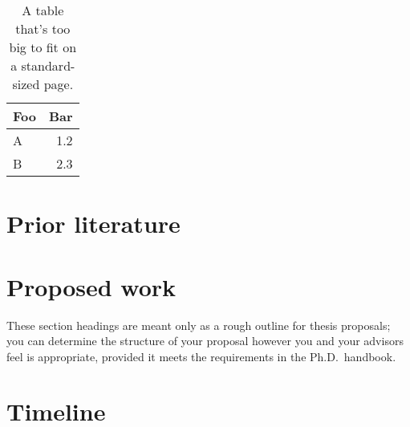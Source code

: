 \documentclass[draft]{ubcstatproposal} %
\theoremstyle{plain}
\begin{document}
\begin{landscapepage}
  \begin{table}
    \centering
    \begin{tabular}{l r}\toprule
      Foo & Bar \\\midrule
      A & 1.2\\
      B & 2.3\\\bottomrule
    \end{tabular}
    \caption[Demonstration extra-wide table]{A table that's too big to fit on a
      standard-sized page.}
    \label{jumbo-table}
  \end{table}
\end{landscapepage}

\section{Prior literature}

\section{Proposed work}

These section headings are meant only as a rough outline for thesis proposals;
you can determine the structure of your proposal however you and your advisors
feel is appropriate, provided it meets the requirements in the Ph.D.\ handbook.


\section{Timeline}


\end{document}
